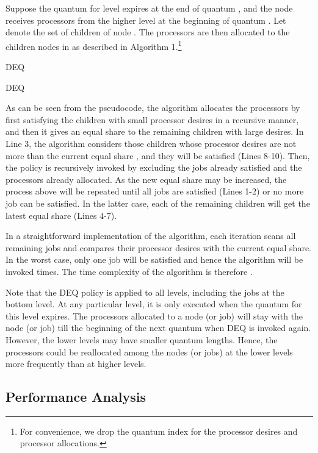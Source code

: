 \documentclass[10pt, a4paper]{article}
\begin{document}
Suppose the quantum for level  expires at the end of quantum , and the node  receives
 processors from the higher level at the beginning of quantum . Let  denote the set of  children of node . The processors are
then allocated to the children nodes in  as described in Algorithm 1.\footnote{For convenience,
we drop the quantum index  for the processor desires and processor allocations.}

\begin{algorithm}
\caption{DEQ}
\begin{algorithmic}[1]
\IF {} \RETURN \ENDIF \STATE  \IF {}  \STATE  \ENDFOR \RETURN \ELSE {} \STATE 
\ENDFOR \STATE DEQ \ENDIF
\end{algorithmic}
\end{algorithm}

As can be seen from the pseudocode, the algorithm allocates the processors by first satisfying the
children with small processor desires in a recursive manner, and then it gives an equal share to
the remaining children with large desires. In Line 3, the algorithm considers those children whose
processor desires are not more than the current equal share , and they will be
satisfied (Lines 8-10). Then, the policy is recursively invoked by excluding the jobs already
satisfied and the processors already allocated. As the new equal share may be increased, the
process above will be repeated until all jobs are satisfied (Lines 1-2) or no more job can be
satisfied. In the latter case, each of the remaining children will get the latest equal share
(Lines 4-7).

In a straightforward implementation of the algorithm, each iteration scans all remaining jobs and
compares their processor desires with the current equal share. In the worst case, only one job will
be satisfied and hence the algorithm will be invoked  times. The time complexity of the
algorithm is therefore .

Note that the DEQ policy is applied to all levels, including the jobs at the bottom level. At any
particular level, it is only executed when the quantum for this level expires. The processors
allocated to a node (or job) will stay with the node (or job) till the beginning of the next
quantum when DEQ is invoked again. However, the lower levels may have smaller quantum lengths.
Hence, the processors could be reallocated among the nodes (or jobs) at the lower levels more
frequently than at higher levels.

\subsection{Performance Analysis}
\end{document}
